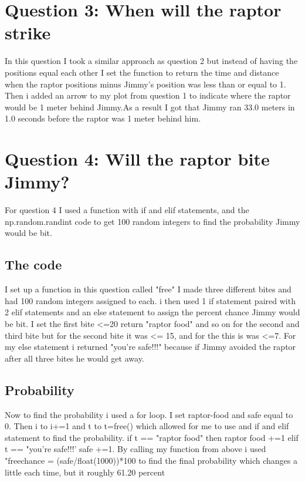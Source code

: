 \documentclass[twocolumn]{revtex4}
\begin{document}
\section{Question 3: When will the raptor strike}

In this question I took a similar approach as question 2 but instead of having the positions equal each other I set the function to return the time and distance when the raptor positions minus Jimmy's position was less than or equal to 1. Then i added an arrow to my plot from question 1 to indicate where the raptor would be 1 meter behind Jimmy.As a result I got that Jimmy ran 33.0 meters in 1.0 seconds before the raptor was 1 meter behind him.

\section{Question 4: Will the raptor bite Jimmy?}

For question 4 I used a function with if and elif statements, and the np.random.randint code to get 100 random integers to find the probability Jimmy would be bit. 

\subsection{The code}

I set up a function in this question called "free" I made three different bites and had 100 random integers assigned to each. i then used 1 if statement paired with 2 elif statements and an else statement to assign the percent chance Jimmy would be bit. I set the first bite <=20 return "raptor food" and so on for the second and third bite but for the second bite it was <= 15, and for the this is was <=7. For my else statement i returned "you're safe!!!" because if Jimmy avoided the raptor after all three bites he would get away. 

\subsection{Probability}

Now to find the probability i used a for loop. I set raptor-food and safe equal to 0. Then i to i+=1 and t to t=free() which allowed for me to use and if and elif statement to find the probability. if t == "raptor food" then raptor food +=1 elif t == "you're safe!!!' safe +=1. By calling my function from above i used "freechance = (safe/float(1000))*100 to find the final probability which changes a little each time, but it roughly 61.20 percent 
\end{document}

